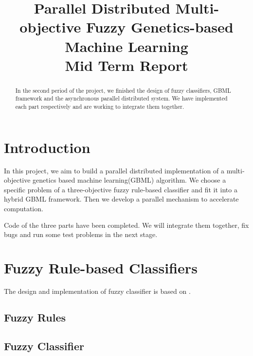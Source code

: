 \documentclass[conference]{IEEEtran}
\begin{document}
  
  \title{Parallel Distributed Multi-objective Fuzzy Genetics-based Machine Learning \\ Mid Term Report}
  
  \author{
  }
  
  \maketitle
  
  \begin{abstract}
  In the second period of the project, we finished the design of fuzzy classifiers, GBML framework and the asynchronous parallel distributed system. We have implemented each part respectively and are working to integrate them together.
  \end{abstract}
  \IEEEpeerreviewmaketitle
  
  \section{Introduction}
  In this project, we aim to build a parallel distributed implementation of a multi-objective genetics based machine learning(GBML) algorithm. We choose a specific problem of a three-objective fuzzy rule-based classifier and fit it into a hybrid GBML framework. Then we develop a parallel mechanism to accelerate computation.

  Code of the three parts have been completed. We will integrate them together, fix bugs and run some test problems in the next stage.

  \section{Fuzzy Rule-based Classifiers}
  The design and implementation of fuzzy classifier is based on \cite{ishibuchi2007analysis}.
  \subsection{Fuzzy Rules}
  \subsection{Fuzzy Classifier}
\end{document}
